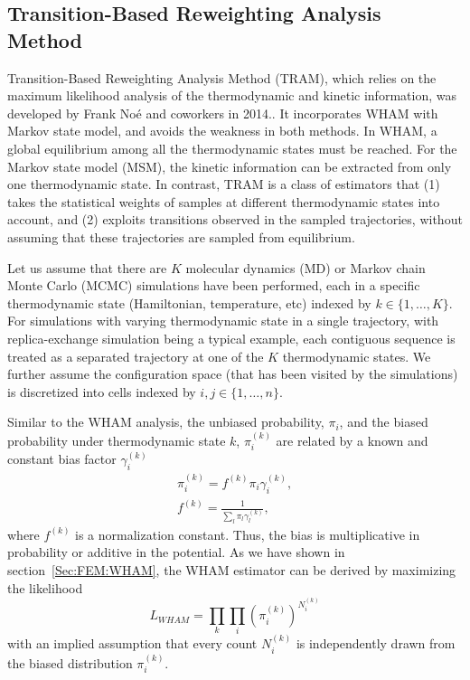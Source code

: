 \subsection{Transition-Based Reweighting Analysis Method\label{Sec:FEM:TRAM}}
Transition-Based Reweighting Analysis Method (TRAM), which relies on the maximum likelihood analysis of the thermodynamic and kinetic information, was developed by Frank No\'{e} and coworkers in 2014.\cite{WuJCP2014}. It incorporates WHAM with Markov state model, and avoids the weakness in both methods. In WHAM, a global equilibrium among all the thermodynamic states must be reached. For the Markov state model (MSM), the kinetic information can be extracted from only one thermodynamic state. In contrast, TRAM is a class of estimators that (1) takes the statistical weights of samples at different thermodynamic states into account, and (2) exploits transitions observed in the sampled trajectories, without assuming that these trajectories are sampled from equilibrium.

Let us assume that there are $K$ molecular dynamics (MD) or Markov chain Monte Carlo (MCMC) simulations have been performed, each in a specific thermodynamic state (Hamiltonian, temperature, etc) indexed by $k\in \{1,\dots,K\}$. For simulations with varying thermodynamic state in a single trajectory, with replica-exchange simulation being a typical example, each contiguous sequence is treated as a separated trajectory at one of the $K$ thermodynamic states. We further assume the configuration space (that has been visited by the simulations) is discretized into cells indexed by $i,j\in \{1,\dots,n\}$. 

Similar to the WHAM analysis, the unbiased probability, $\pi_i$, and the biased probability under thermodynamic state $k$, $\pi_i^{(k)}$ are related by a known and constant bias factor $\gamma_i^{(k)}$
\begin{align}
    \pi_i^{(k)}=f^{(k)}\pi_i\gamma_i^{(k)},\label{Eq:FEM:TRAM:reweight}\\
    f^{(k)}=\frac{1}{\sum_l \pi_l\gamma_l^{(k)}}\label{Eq:FEM:TRAM:f},
\end{align}
where $f^{(k)}$ is a normalization constant. Thus, the bias is multiplicative in probability or additive in the potential. As we have shown in section~\ref{Sec:FEM:WHAM}, the WHAM estimator can be derived by maximizing the likelihood
\begin{equation}
    L_{WHAM}=\prod\limits_k\prod\limits_i (\pi_i^{(k)})^{N_i^{(k)}}
\end{equation}
with an implied assumption that every count $N_i^{(k)}$ is independently drawn from the biased distribution $\pi_i^{(k)}$.

